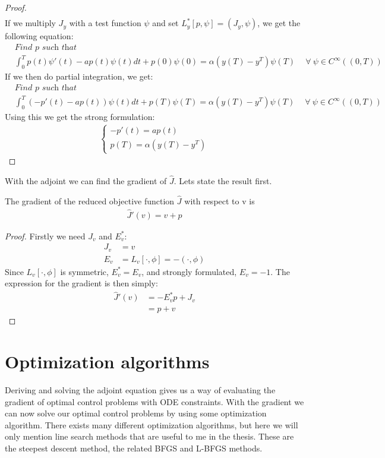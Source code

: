 \begin{proof}
\begin{align*}
\end{align*}
If we multiply $J_y$ with a test function $\psi$ and set $L_y^*[p,\psi]=(J_y,\psi)$, we get the following equation:
\begin{align*}
&\textit{Find $p$ such that}\\
&\int_0^Tp(t)\psi'(t)-a p(t)\psi(t)dt + p(0)\psi(0)= \alpha(y(T)-y^T)\psi(T)\ \quad\forall \ \psi \in C^{\infty}((0,T))
\end{align*}
If we then do partial integration, we get:
\begin{align*}
&\textit{Find $p$ such that}\\
&\int_0^T(-p'(t)-ap(t))\psi(t)dt +p(T)\psi(T)= \alpha(y(T)-y^T)\psi(T)\ \quad\forall \ \psi \in C^{\infty}((0,T))
\end{align*}
Using this we get the strong formulation:
\begin{align*}
   \left\{
     \begin{array}{lr}
       -p'(t) = ap(t) \\
       p(T) = \alpha( y(T)-y^T)
     \end{array}
   \right.
\end{align*}
\end{proof}
With the adjoint we can find the gradient of $\hat{J}$. Lets state the result first.
\begin{theorem}
The gradient of the reduced objective function $\hat{J}$ with respect to v is
\begin{align}
\hat{J}'(v)=v+p 
\end{align} 
\end{theorem}
\begin{proof}
Firstly we need $J_v$ and $E_v^*$:
\begin{align*}
J_v &= v \\
E_v &= L_v[\cdot,\phi] = -(\cdot,\phi)
\end{align*}
Since $L_v[\cdot,\phi]$ is symmetric, $E_v^*=E_v$, and strongly formulated, $E_v=-1$. The expression for the gradient is then simply:
\begin{align*}
\hat{J}'(v)&=-E_v^*p + J_v \\
&= p+v 
\end{align*} 
\end{proof}
\section{Optimization algorithms}
Deriving and solving the adjoint equation gives us a way of evaluating the gradient of optimal control problems with ODE constraints. With the gradient we can now solve our optimal control problems by using some optimization algorithm. There exists many different optimization algorithms, but here we will only mention line search methods that are useful to me in the thesis. These are the steepest descent method, the related BFGS and L-BFGS methods.  
